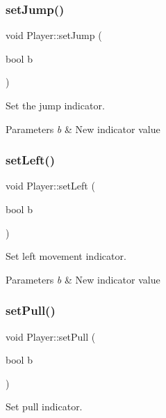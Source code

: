 \subsubsection{\texorpdfstring{set\+Jump()}{setJump()}}
{\footnotesize\ttfamily void Player\+::set\+Jump (\begin{DoxyParamCaption}\item[{bool}]{b }\end{DoxyParamCaption})}



Set the jump indicator. 


\begin{DoxyParams}{Parameters}
{\em b} & New indicator value \\
\hline
\end{DoxyParams}
\mbox{\label{class_player_a19eb681affb69020b7b5638c435be08f}} 
\subsubsection{\texorpdfstring{set\+Left()}{setLeft()}}
{\footnotesize\ttfamily void Player\+::set\+Left (\begin{DoxyParamCaption}\item[{bool}]{b }\end{DoxyParamCaption})}



Set left movement indicator. 


\begin{DoxyParams}{Parameters}
{\em b} & New indicator value \\
\hline
\end{DoxyParams}
\mbox{\label{class_player_adaf6df1aae76fe8d425a9691c373747b}} 
\subsubsection{\texorpdfstring{set\+Pull()}{setPull()}}
{\footnotesize\ttfamily void Player\+::set\+Pull (\begin{DoxyParamCaption}\item[{bool}]{b }\end{DoxyParamCaption})}



Set pull indicator. 


